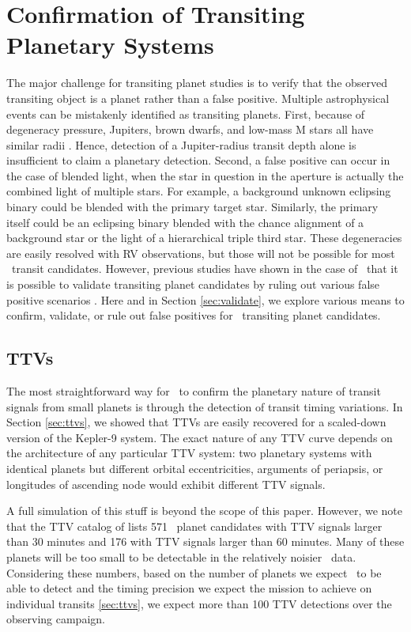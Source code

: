 \section{Confirmation of Transiting Planetary Systems}
\label{sec:confirm}


The major challenge for transiting planet studies is to verify that the observed transiting object is a planet rather than a false positive. 
Multiple astrophysical events can be mistakenly identified as transiting planets. 
First, because of degeneracy pressure, Jupiters, brown dwarfs, and low-mass M stars all have similar radii \citep{Chabrier97}.
Hence, detection of a Jupiter-radius transit depth alone is insufficient to claim a planetary detection. 
Second, a false positive can occur in the case of blended light, when the star in 
question in the aperture is actually the combined light of multiple stars.
For example, a background unknown eclipsing binary could be blended with the primary target
star.
Similarly, the primary itself could be an eclipsing binary blended with the chance alignment
of a background star or the light of a hierarchical triple third star.
These degeneracies are easily resolved with RV observations, but those will not be possible for most \WF\ transit candidates.
However, previous studies have shown in the case of \kep\ that it is possible to validate transiting planet candidates by ruling out various false positive scenarios \citep{Morton12, Morton16}. Here and in Section \ref{sec:validate}, we explore various means to confirm, validate, or rule out false positives for \WF\ transiting planet candidates.




\subsection{TTVs}

The most straightforward way for \WF\ to confirm the planetary nature of transit signals from small
planets is through the detection of transit timing variations.
In Section \ref{sec:ttvs}, we showed that TTVs are easily recovered for a scaled-down version of the Kepler-9 system.
The exact nature of any TTV curve depends on the architecture of any particular TTV 
system: two planetary systems with identical planets but different orbital eccentricities,
arguments of periapsis, or longitudes of ascending node would exhibit different TTV
signals. 

A full simulation of this stuff is beyond the scope of this paper. However, we note that
the TTV catalog of \citet{Holczer16} lists 571 \kep\ planet candidates with
TTV signals larger than 30 minutes and 176 with TTV signals larger than 60 minutes.
Many of these planets will be too small to be detectable in the relatively noisier
\WF\ data.
Considering these numbers,
based on the number of planets we expect \WF\ to be able to detect and the timing precision 
we expect the mission to achieve on individual transits \ref{sec:ttvs}, 
we expect more than 100 TTV detections over the observing campaign. 

